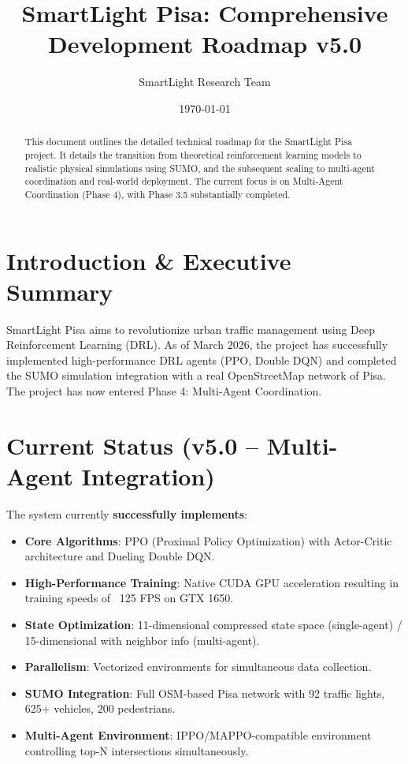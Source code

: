 \documentclass[a4paper,11pt]{article}
\title{\textbf{SmartLight Pisa: Comprehensive Development Roadmap v5.0}}
\author{SmartLight Research Team}
\date{\today}
\begin{document}
\maketitle

\begin{abstract}
This document outlines the detailed technical roadmap for the SmartLight Pisa project. It details the transition from theoretical reinforcement learning models to realistic physical simulations using SUMO, and the subsequent scaling to multi-agent coordination and real-world deployment. The current focus is on Multi-Agent Coordination (Phase 4), with Phase 3.5 substantially completed.
\end{abstract}

\tableofcontents
\newpage

\section{Introduction \& Executive Summary}
SmartLight Pisa aims to revolutionize urban traffic management using Deep Reinforcement Learning (DRL). As of March 2026, the project has successfully implemented high-performance DRL agents (PPO, Double DQN) and completed the SUMO simulation integration with a real OpenStreetMap network of Pisa. The project has now entered Phase 4: Multi-Agent Coordination.

\section{Current Status (v5.0 -- Multi-Agent Integration)}
The system currently \textbf{successfully implements}:
\begin{itemize}
    \item \textbf{Core Algorithms}: PPO (Proximal Policy Optimization) with Actor-Critic architecture and Dueling Double DQN.
    \item \textbf{High-Performance Training}: Native CUDA GPU acceleration resulting in training speeds of ~125 FPS on GTX 1650.
    \item \textbf{State Optimization}: 11-dimensional compressed state space (single-agent) / 15-dimensional with neighbor info (multi-agent).
    \item \textbf{Parallelism}: Vectorized environments for simultaneous data collection.
    \item \textbf{SUMO Integration}: Full OSM-based Pisa network with 92 traffic lights, 625+ vehicles, 200 pedestrians.
    \item \textbf{Multi-Agent Environment}: IPPO/MAPPO-compatible environment controlling top-N intersections simultaneously.
\end{itemize}
\end{document}
